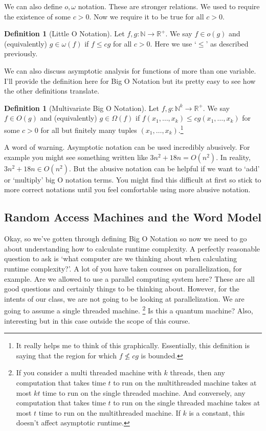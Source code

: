 \documentclass[10pt]{article}
\theoremstyle{plain}
\theoremstyle{definition}
\newtheorem{defn}[thm]{Definition} %
\newcommand{\NN}{\mathbb{N}}
\newcommand{\RR}{\mathbb{R}}
\numberwithin{equation}{section}
\numberwithin{figure}{section}
\begin{document}
\noindent We can also define $o, \omega$ notation. These are stronger relations. We used to require the existence of some $c > 0$. Now we require it to be true for all $c > 0$.

\begin{defn}[Little O Notation]
Let $f, g : \NN \rightarrow \RR^+$. We say $f \in o(g)$ and (equivalently) $g \in \omega(f)$ if $f \leq c g$ for all $c > 0$. Here we use `$\leq$' as described previously.
\end{defn}

\noindent We can also discuss asymptotic analysis for functions of more than one variable. I'll provide the definition here for Big O Notation but its pretty easy to see how the other definitions translate. 

\begin{defn}[Multivariate Big O Notation]
Let $f,g : \NN^k \rightarrow \RR^+$. We say $f \in O(g)$ and (equivalently) $g \in \Omega(f)$ if $f(x_1, \ldots, x_k) \leq c g(x_1, \ldots, x_k)$ for some $c > 0$ for all but finitely many tuples $(x_1, \ldots, x_k)$.\footnote{It really helps me to think of this graphically. Essentially, this definition is saying that the region for which $f \not \leq c g$ is bounded.}
\end{defn}

\noindent A word of warning. Asymptotic notation can be used incredibly abusively. For example you might see something written like $3 n^2 + 18n = O(n^2)$. In reality, $3 n^2 + 18n \in O(n^2)$. But the abusive notation can be helpful if we want to `add' or `multiply' big O notation terms. You might find this difficult at first so stick to more correct notations until you feel comfortable using more abusive notation.

\subsection{Random Access Machines and the Word Model}
Okay, so we've gotten through defining Big O Notation so now we need to go about understanding how to calculate runtime complexity. A perfectly reasonable question to ask is `what computer are we thinking about when calculating runtime complexity?'. A lot of you have taken courses on parallelization, for example. Are we allowed to use a parallel computing system here? These are all good questions and certainly things to be thinking about. However, for the intents of our class, we are not going to be looking at parallelization. We are going to assume a single threaded machine. \footnote{If you consider a multi threaded machine with $k$ threads, then any computation that takes time $t$ to run on the multithreaded machine takes at most $kt$ time to run on the single threaded machine. And conversely, any computation that takes time $t$ to run on the single threaded machine takes at most $t$ time to run on the multithreaded machine. If $k$ is a constant, this doesn't affect asymptotic runtime.} Is this a quantum machine? Also, interesting but in this case outside the scope of this course. \\
\end{document}
